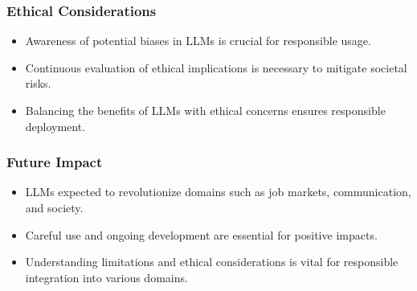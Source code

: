 


\begin{frame}[fragile]
  \frametitle{Ethical Considerations}

  \begin{itemize}
    \item Awareness of potential biases in LLMs is crucial for responsible usage.
    \item Continuous evaluation of ethical implications is necessary to mitigate societal risks.
    \item Balancing the benefits of LLMs with ethical concerns ensures responsible deployment.

  \end{itemize}


\end{frame}


\begin{frame}[fragile]
  \frametitle{Future Impact}

  \begin{itemize}
    \item LLMs expected to revolutionize domains such as job markets, communication, and society.
    \item Careful use and ongoing development are essential for positive impacts.
    \item Understanding limitations and ethical considerations is vital for responsible integration into various domains.
  \end{itemize}
\end{frame}

